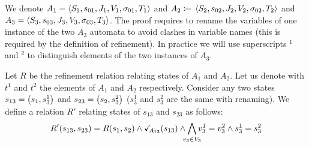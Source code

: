 \documentclass[runningheads]{llncs}
\begin{document}
We denote $A_1=  \left<S_1,s_{01},J_1,V_1,\sigma_{01},T_1\right>$ and \(A_2 \defobject \OA{S_2}{s_{02}}{J_2}{V_2}{\sigma_{02}}{T_2}\) and $A_3 = \left<S_3,s_{03},J_3,V_3,\sigma_{03},T_3\right>$. The proof requires  to rename the variables of one instance of the two $A_3$ automata to avoid clashes in variable names (this is required by the definition of refinement). In practice we will use superscripts ${}^1$ and ${}^2$ to distinguish elements of the two instances of $A_3$.

Let $R$ be the refinement relation relating states of $A_1$ and $A_2$. 
Let us denote with $t^1$ and $t^2$  the elements of $A_1$ and $A_2$ respectively.
Consider any two states $s_{13} = {\left(s_1,s^1_3\right)}$ and $s_{23} = {\left(s_2,s^2_3\right)}$ ($s^1_3$ and $s^2_3$  are the same with renaming). We define a relation $R'$ relating states of $s_{13}$ and $s_{23}$ as follows:
\[ R' \mpar{s_{13}, s_{23}} = R\mpar{s_{1}, s_{2}} \wedge \reach{A_{13}}\mpar{s_{13}} \wedge \bigwedge_\subbox{v_3\in V_3}
 v^1_3=v^2_3\wedge s^1_3 = s^2_3\]
\end{document}
